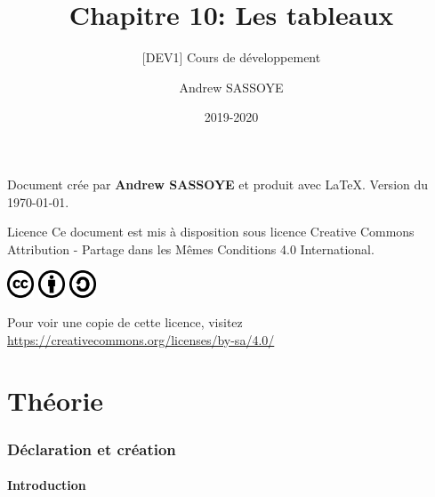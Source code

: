 \documentclass{beamer}
\title{Chapitre 10: Les tableaux}
\subtitle{\tiny [DEV1] Cours de développement}
\author{Andrew SASSOYE}
\date{2019-2020}
\begin{document}
	\begin{frame}
		\titlepage
	\end{frame}

	\begin{frame}
        \center Document crée par \textbf{Andrew SASSOYE} et produit avec \LaTeX.
        \tiny Version du \today. \normalsize

		\begin{block}{Licence}
            Ce document est mis à disposition sous licence Creative Commons
            Attribution - Partage dans les Mêmes Conditions 4.0 International.

            \begin{center}
                \includegraphics[width=8mm]{./styles/images/cc}
                \includegraphics[width=8mm]{./styles/images/by}
                \includegraphics[width=8mm]{./styles/images/sa}
            \end{center}

            \center\tiny Pour voir une copie de cette licence, visitez
            \href{https://creativecommons.org/licenses/by-sa/4.0/}{https://creativecommons.org/licenses/by-sa/4.0/}
            \normalsize
        \end{block}


    \end{frame}

    \part{Théorie}
    \frame{\partpage}

    \section{Déclaration et création}\label{sec:declaration-et-creation}
        \subsection{Introduction}\label{subsec:introduction}
            
\end{document}
